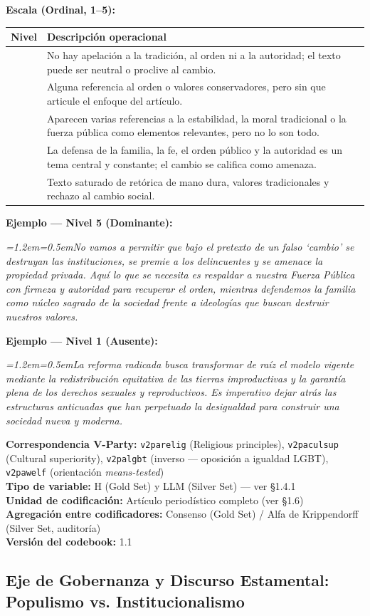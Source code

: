 \documentclass[11pt,letterpaper]{article}
\newcommand{\metaficha}[1]{%
  \par\smallskip\noindent\footnotesize\color{gris}%
  \textbf{Correspondencia V-Party:} #1\\
  \textbf{Tipo de variable:} H (Gold Set) y LLM (Silver Set) — ver §1.4.1\\
  \textbf{Unidad de codificación:} Artículo periodístico completo (ver §1.6)\\
  \textbf{Agregación entre codificadores:} Consenso (Gold Set) / Alfa de Krippendorff (Silver Set, auditoría)\\
  \textbf{Versión del codebook:} 1.1\par\normalsize\color{black}\medskip}
\newcommand{\ejemplo}[2]{%
  \par\smallskip\noindent\textbf{Ejemplo — #1:}\par\nopagebreak
  \begingroup\itshape\small\leftskip=1.2em\rightskip=0.5em\noindent #2\par\endgroup\smallskip}
\begin{document}
\textbf{Escala (Ordinal, 1–5):}
\begin{longtable}{@{}>{\centering\arraybackslash}p{1.1cm}p{14.3cm}@{}}
\toprule \textbf{Nivel} & \textbf{Descripción operacional}\\ \midrule\endhead
1 & No hay apelación a la tradición, al orden ni a la autoridad; el texto puede ser neutral o proclive al
cambio.\\
\addlinespace
2 & Alguna referencia al orden o valores conservadores, pero sin que articule el enfoque del artículo.\\
\addlinespace
3 & Aparecen varias referencias a la estabilidad, la moral tradicional o la fuerza pública como elementos
relevantes, pero no lo son todo.\\
\addlinespace
4 & La defensa de la familia, la fe, el orden público y la autoridad es un tema central y constante; el cambio
se califica como amenaza.\\
\addlinespace
5 & Texto saturado de retórica de mano dura, valores tradicionales y rechazo al cambio social.\\
\bottomrule
\end{longtable}

\ejemplo{Nivel 5 (Dominante)}{No vamos a permitir que bajo el pretexto de un falso ‘cambio’ se destruyan
las instituciones, se premie a los delincuentes y se amenace la propiedad privada. Aquí lo que se necesita es
respaldar a nuestra Fuerza Pública con firmeza y autoridad para recuperar el orden, mientras defendemos la
familia como núcleo sagrado de la sociedad frente a ideologías que buscan destruir nuestros valores.}

\ejemplo{Nivel 1 (Ausente)}{La reforma radicada busca transformar de raíz el modelo vigente mediante la
redistribución equitativa de las tierras improductivas y la garantía plena de los derechos sexuales y
reproductivos. Es imperativo dejar atrás las estructuras anticuadas que han perpetuado la desigualdad para
construir una sociedad nueva y moderna.}

\metaficha{\texttt{v2parelig} (Religious principles), \texttt{v2paculsup} (Cultural superiority),
\texttt{v2palgbt} (inverso — oposición a igualdad LGBT), \texttt{v2pawelf} (orientación \emph{means-tested})}

\newpage
\subsection{Eje de Gobernanza y Discurso Estamental: Populismo vs. Institucionalismo}
\end{document}
